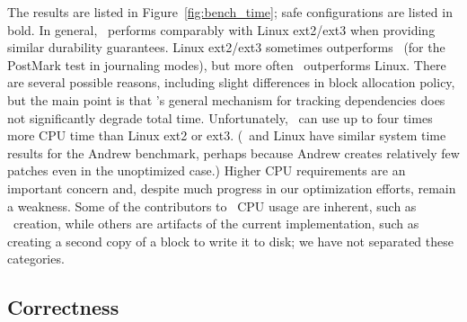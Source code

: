 The results are listed in
Figure~\ref{fig:bench_time};
%
safe configurations are listed in bold.
%
In general, \Kudos\ performs comparably with Linux
ext2/ext3 when providing similar durability guarantees. Linux
ext2/ext3 sometimes outperforms \Kudos\ (for the PostMark test in
journaling modes), but more often \Kudos\ outperforms Linux.  There are
several possible reasons, including slight differences in block allocation
policy, but the main point is that \Kudos's general mechanism for
tracking dependencies does not significantly degrade total time.
%
Unfortunately, 
\Kudos\ can use up to four times more CPU time than Linux ext2 or
ext3. (\Kudos\ and Linux have similar
system time results for the Andrew benchmark, perhaps because Andrew
creates relatively few patches even in the unoptimized case.)
%
%
Higher CPU requirements are an important concern and, despite much progress
in our optimization efforts, remain a weakness.
%
Some of the contributors to \Kudos\ CPU usage are inherent, such as
\patch\ creation, while others are artifacts of the current
implementation, such as creating a second copy of a block to write it to
disk; we have not separated these categories.
%
%
\begin{comment}
Further, while \Kudos\ I/O times are lower than Linux ext2/ext3 I/O
times for the untar and delete benchmarks, we have found that small
block allocation strategy changes can significantly affect I/O time
for many of these benchmarks. This further emphasizes the importance
of the system CPU time difference.
\end{comment}

\begin{comment}
Unlike the untar, delete, and Andrew benchmarks, Linux ext3 writeback
and journal modes outperform \Kudos\ meta journal and full journal
modes, respectively, at PostMark.
\end{comment}


\subsection {Correctness}
\label{sec:eval:correctness}

